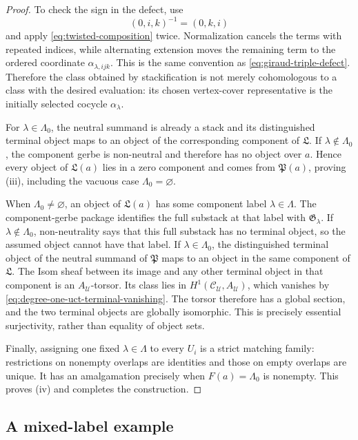 \begin{proof}
To check the sign in the defect, use
\[
 (0,i,k)^{-1}=(0,k,i)
\]
and apply \eqref{eq:twisted-composition} twice.  Normalization cancels the
terms with repeated indices, while alternating extension moves the remaining
term to the ordered coordinate \(\alpha_{\lambda,ijk}\).  This is the same
convention as \eqref{eq:giraud-triple-defect}.  Therefore the class obtained
by stackification is not merely cohomologous to a class with the desired
evaluation: its chosen vertex-cover representative is the initially
selected cocycle \(\alpha_\lambda\).

For \(\lambda\in\Lambda_0\), the neutral summand is already a stack and its
distinguished terminal object maps to an object of the corresponding
component of \(\mathfrak L\).  If \(\lambda\notin\Lambda_0\), the component
gerbe is non-neutral and therefore has no object over \(a\).  Hence every object of
\(\mathfrak L(a)\) lies in a zero component and comes from
\(\mathfrak P(a)\), proving (iii), including the vacuous case
\(\Lambda_0=\varnothing\).

When \(\Lambda_0\ne\varnothing\), an object of
\(\mathfrak L(a)\) has some component label
\(\lambda\in\Lambda\).  The component-gerbe package identifies the full
substack at that label with \(\mathfrak G_\lambda\).  If
\(\lambda\notin\Lambda_0\), non-neutrality says that this full substack has
no terminal object, so the assumed object cannot have that label.  If
\(\lambda\in\Lambda_0\), the distinguished terminal object of the neutral
summand of \(\mathfrak P\) maps to an object in the same component of
\(\mathfrak L\).  The Isom sheaf between its image and any other terminal
object in that component is an \(A_{\mathcal U}\)-torsor.  Its class lies in
\(H^1(\mathcal C_{\mathcal U},A_{\mathcal U})\), which vanishes by
\eqref{eq:degree-one-uct-terminal-vanishing}.  The torsor therefore has a
global section, and the two terminal objects are globally isomorphic.  This
is precisely essential surjectivity, rather than equality of object sets.

Finally, assigning one fixed \(\lambda\in\Lambda\) to every \(U_i\) is a
strict matching family: restrictions on nonempty overlaps are identities and
those on empty overlaps are unique.  It has an amalgamation precisely when
\(F(a)=\Lambda_0\) is nonempty.  This proves (iv) and completes the
construction.

\end{proof}

\subsection*{A mixed-label example}

